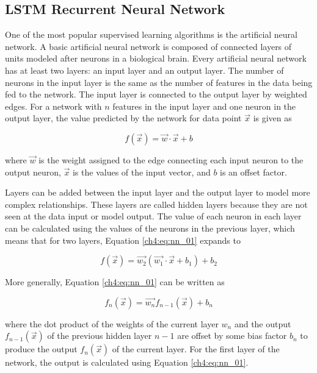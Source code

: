 \subsection{LSTM Recurrent Neural Network}


One of the most popular supervised learning algorithms is the artificial neural network. A basic artificial neural network is composed of connected layers of units modeled after neurons in a biological brain. Every artificial neural network has at least two layers: an input layer and an output layer. The number of neurons in the input layer is the same as the number of features in the data being fed to the network. The input layer is connected to the output layer by weighted edges. For a network with $n$ features in the input layer and one neuron in the output layer, the value predicted by the network 
for data point $\vec{x}$ is given as

\begin{equation}
\label{ch4:eq:nn_01}
f(\vec{x}) = \vec{w} \cdot \vec{x} + b
\end{equation}

\noindent where $\vec{w}$ is the weight assigned to the edge connecting each input neuron to the output neuron, $\vec{x}$ is the values of the input vector, and $b$ is an offset factor.

Layers can be added between the input layer and the output layer to model more complex relationships. These layers are called hidden layers because they are not seen at the data input or model output. The value of each neuron in each layer can be calculated using the values of the neurons in the previous layer, which means that for two layers, Equation \ref{ch4:eq:nn_01} expands to

\begin{equation}
f(\vec{x}) = \vec{w_2} (\vec{w_1} \cdot \vec{x} + b_1) + b_2
\end{equation}

More generally, Equation \ref{ch4:eq:nn_01} can be written as

\begin{equation}
\label{ch4:eq:nn_02}
f_n(\vec{x}) = \vec{w_n} f_{n-1}(\vec{x})+ b_n
\end{equation}

\noindent where the dot product of the weights of the current layer $w_n$ and the output $f_{n-1}(\vec{x})$ of the previous hidden layer $n-1$ are offset by some bias factor $b_n$ to produce the output $f_n(\vec{x})$ of the current layer. For the first layer of the network, the output is calculated using Equation \ref{ch4:eq:nn_01}.

